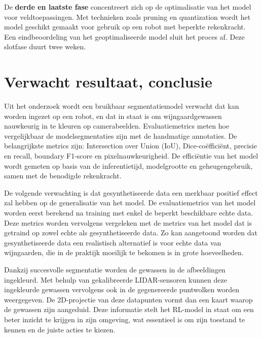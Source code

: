 De \textbf{derde en laatste fase} concentreert zich op de optimalisatie van het model voor veldtoepassingen. Met technieken zoals pruning en quantization wordt het model geschikt gemaakt voor gebruik op een robot met beperkte rekenkracht. Een eindbeoordeling van het geoptimaliseerde model sluit het proces af. Deze slotfase duurt twee weken.

\section{Verwacht resultaat, conclusie}%
\label{sec:verwachte_resultaten}

Uit het onderzoek wordt een bruikbaar segmentatiemodel verwacht dat kan worden ingezet op een robot, en dat in staat is om wijngaardgewassen nauwkeurig in te kleuren op camerabeelden. Evaluatiemetrics meten hoe vergelijkbaar de modelsegmentaties zijn met de handmatige annotaties. De belangrijkste metrics zijn: Intersection over Union (IoU), Dice-coëfficiënt, precisie en recall, boundary F1-score en pixelnauwkeurigheid. De efficiëntie van het model wordt gemeten op basis van de inferentietijd, modelgrootte en geheugengebruik, samen met de benodigde rekenkracht.

De volgende verwachting is dat gesynthetiseerde data een merkbaar positief effect zal hebben op de generalisatie van het model. De evaluatiemetrics van het model worden eerst berekend na training met enkel de beperkt beschikbare echte data. Deze metrics worden vervolgens vergeleken met de metrics van het model dat is getraind op zowel echte als gesynthetiseerde data. Zo kan aangetoond worden dat gesynthetiseerde data een realistisch alternatief is voor echte data van wijngaarden, die in de praktijk moeilijk te bekomen is in grote hoeveelheden.

Dankzij succesvolle segmentatie worden de gewassen in de afbeeldingen ingekleurd. Met behulp van gekalibreerde LIDAR-sensoren kunnen deze ingekleurde gewassen vervolgens ook in de gegenereerde puntwolken worden weergegeven. De 2D-projectie van deze datapunten vormt dan een kaart waarop de gewassen zijn aangeduid. Deze informatie stelt het RL-model in staat om een beter inzicht te krijgen in zijn omgeving, wat essentieel is om zijn toestand te kennen en de juiste acties te kiezen.